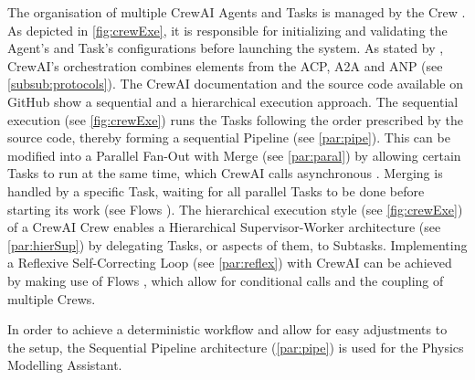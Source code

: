\documentclass[
	fontsize = 11pt,
	paper = a4,
	draft = false,
	twoside = true,
	titlepage = false
]{scrartcl}
\numberwithin{equation}{subsection}
\begin{document}
	The organisation of multiple CrewAI \glspl{Agent} and Tasks is managed by the Crew \autocite{crewaiCrew}. As depicted in \autoref{fig:crewExe}, it is responsible for initializing and validating the \gls{Agent}'s and Task's configurations before launching the system. As stated by \citeauthor{orchFrameworks} \autocite{orchFrameworks}, CrewAI's orchestration combines elements from the ACP, A2A and ANP (see \autoref{subsub:protocols}). The CrewAI documentation \autocite{crewAi} and the source code available on GitHub \autocite{crewPy} show a sequential and a hierarchical execution approach. The sequential execution (see \autoref{fig:crewExe}) runs the Tasks following the order prescribed by the source code, thereby forming a sequential Pipeline (see \autoref{par:pipe}). This can be modified into a Parallel Fan-Out with Merge (see \autoref{par:paral}) by allowing certain Tasks to run at the same time, which CrewAI calls asynchronous \autocite{crewaiParallel}. Merging is handled by a specific Task, waiting for all parallel Tasks to be done before starting its work (see Flows \autocite{crewaiFlow}). The hierarchical execution style (see \autoref{fig:crewExe}) of a CrewAI Crew enables a Hierarchical Supervisor-Worker architecture (see \autoref{par:hierSup}) by delegating Tasks, or aspects of them, to Subtasks. Implementing a Reflexive Self-Correcting Loop (see \autoref{par:reflex}) with CrewAI can be achieved by making use of Flows \autocite{crewaiFlow}, which allow for conditional calls and the coupling of multiple Crews.
	
	In order to achieve a deterministic workflow and allow for easy adjustments to the setup, the Sequential Pipeline architecture (\autoref{par:pipe}) is used for the Physics Modelling Assistant.
	
\end{document}
